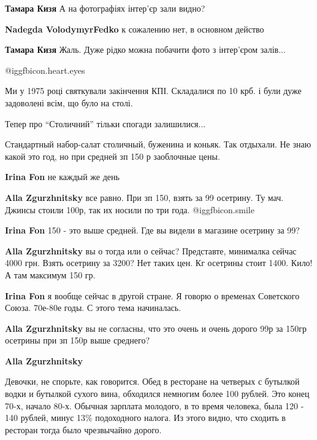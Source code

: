 \begin{itemize}
\begin{itemize} %
\textbf{Тамара Кизя} А на фотографіях інтер'єр зали видно?

\textbf{Nadegda VolodymyrFedko} к сожалению нет, в основном действо

\textbf{Тамара Кизя} Жаль. Дуже рідко можна побачити фото з інтер'єром залів...
\end{itemize} %

 @igg{fbicon.heart.eyes} 


Ми у 1975 році святкували закінчення КПІ. Складалися по 10 крб. і були дуже
задоволені всім, що було на столі.

Тепер про \enquote{Столичний} тільки спогади залишилися...



Стандартный набор-салат столичный, буженина и коньяк. Так отдыхали. Не знаю
какой это год, но при средней зп 150 р заоблочные цены.

\begin{itemize} %
\textbf{Irina Fon} не каждый же день

\begin{itemize} %
\textbf{Alla Zgurzhnitsky} все равно. При зп 150, взять за 99 осетрину. Ту мач. Джинсы стоили 100р, так их носили по три года.  @igg{fbicon.smile} 

\textbf{Irina Fon} 150 - это выше средней. Где вы видели в магазине осетрину за 99?

\textbf{Alla Zgurzhnitsky} вы о тогда или о сейчас? Представте, минималка сейчас 4000 грн. Взять осетрину за 3200? Нет таких цен. Кг осетрины стоит 1400. Кило! А там максимум 150 гр.

\textbf{Irina Fon} я вообще сейчас в другой стране. Я говорю о временах Советского Союза. 70е-80е годы. С этого тема начиналась.

\textbf{Alla Zgurzhnitsky} вы не согласны, что это очень и очень дорого 99р за 150гр осетрины при зп 150р выше среднего?

\textbf{Alla Zgurzhnitsky} 

Девочки, не спорьте, как говорится. Обед в ресторане на четверых с бутылкой
водки и бутылкой сухого вина, обходился немногим более 100 рублей. Это конец
70-х, начало 80-х. Обычная зарплата молодого, в то время человека, была 120 -
140 рублей, минус 13\% подоходного налога. Из этого видно, что сходить в
ресторан тогда было чрезвычайно дорого.



\end{itemize}
\end{itemize}
\end{itemize}

